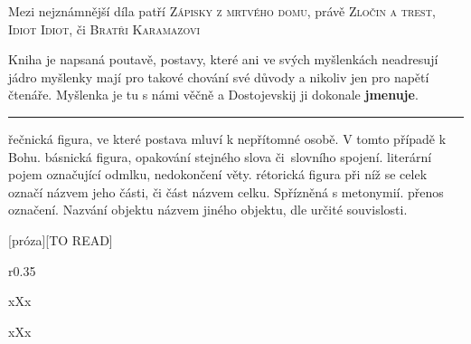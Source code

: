 \documentclass{extarticle} %
\begin{document}

\noindent 
Mezi nejznámnější díla patří \textsc{Zápisky z mrtvého domu}, právě \textsc{Zločin a trest}, \textsc{Idiot Idiot}, či \textsc{Bratři Karamazovi}






\noindent 
Kniha je napsaná poutavě, postavy, které ani ve svých myšlenkách neadresují jádro myšlenky mají pro takové chování své důvody a nikoliv jen pro napětí čtenáře.
Myšlenka je tu s námi věčně a Dostojevskij ji dokonale \textbf{jmenuje}.

\vfill

\noindent\begin{minipage}{\textwidth}
    {\textcolor{\wpagecolor}{\rule{\linewidth}{0.4pt}}
    \footnotesize
     řečnická figura, ve které postava mluví k nepřítomné osobě.
    V tomto případě k Bohu.
     básnická figura, opakování stejného slova či~slovního spojení. 
     literární pojem označující odmlku, nedokončení věty.
     rétorická figura při níž se celek označí názvem jeho části, či část názvem celku.
    Spřízněná s metonymií.
     přenos označení.
    Nazvání objektu názvem jiného objektu, dle určité souvislosti.
    }
\end{minipage}

\newpage


\changefontsize{8pt}

[próza][TO READ]

\noindent\begin{wrapfigure}{r}{0.35\textwidth}
\tiny

\setlength{\parindent}{3pt}
xXx
\end{wrapfigure}


\noindent xXx

\end{document}
